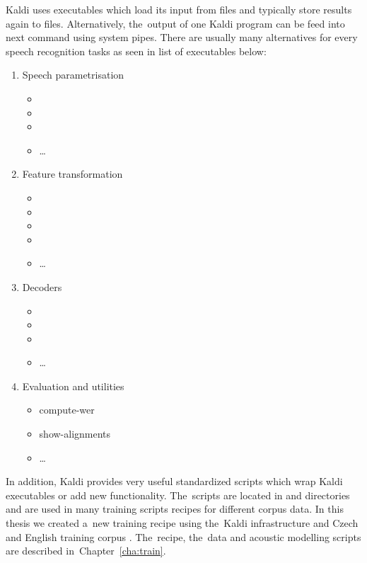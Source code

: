 Kaldi uses executables which load its input from files and typically store results again to files.
Alternatively, the~output of one Kaldi program can be feed into next command using system pipes.
There are usually many alternatives for every speech recognition tasks as seen in list of executables below:
\begin{enumerate}
    \item Speech parametrisation
        \begin{itemize}
            \item {}
            \item {}
            \item {}
            \item \ldots
        \end{itemize}
    \item Feature transformation
        \begin{itemize}
            \item {}
            \item {}
            \item {}
            \item {}
            \item \ldots
        \end{itemize}
    \item Decoders
        \begin{itemize}
            \item {}
            \item {}
            \item {}
            \item \ldots
        \end{itemize}
    \item Evaluation and utilities
        \begin{itemize}
            \item compute-wer
            \item show-alignments
            \item \ldots
        \end{itemize}
\end{enumerate}
In addition, Kaldi provides very useful standardized scripts which wrap Kaldi executables or add new functionality. 
The~scripts are located in  and  directories and are used in many training scripts recipes for different corpus data.
In this thesis we created a~new training recipe using the~Kaldi infrastructure and Czech and English training corpus \cite{korvas_2014}.
The~recipe, the~data and acoustic modelling scripts are described in~Chapter~\ref{cha:train}.

